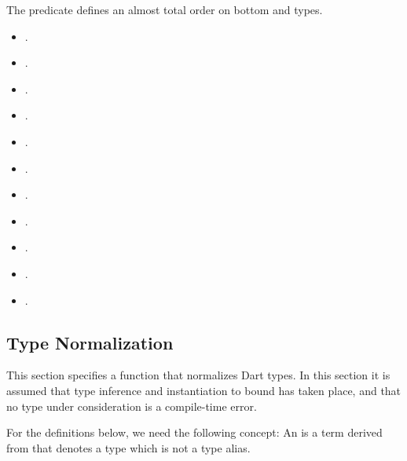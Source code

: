 \documentclass[makeidx]{article}
\begin{document}
{\noindent
The \Index{\IsMoreBottomTypeName} predicate defines an almost total order on
bottom and  types.

\begin{itemize}
\item {}.
\item {}.
\item {}.
\item {}.
\item {}.
\item {}.
\item {}.
\item {}.
\item {}.
\item {}.
\item {}.
\end{itemize}


\subsection{Type Normalization}

\LMHash{}%
This section specifies a function that normalizes Dart types.
In this section it is assumed that type inference and
instantiation to bound has taken place,
and that no type under consideration is a compile-time error.

\LMHash{}%
For the definitions below, we need the following concept:
An 
is a term derived from 
that denotes a type which is not a type alias.


}
\end{document}
